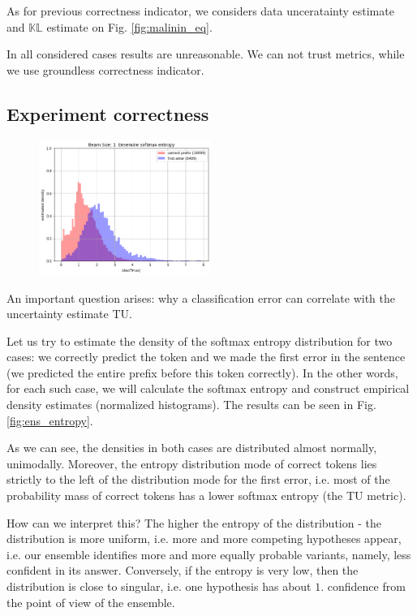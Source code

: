 \documentclass[a4paper,14pt]{extarticle}
\begin{document}
	As for previous correctness indicator, we considers data unceratainty estimate and $\mathbb{KL}$ estimate on Fig. \ref{fig:malinin_eq}.
	
	In all considered cases results are unreasonable. We can not trust metrics, while we use groundless correctness indicator.
	
\subsection{Experiment correctness}
	\begin{figure}
		\includegraphics[width=0.5\textwidth]{images/ens_entropy.png}
	\end{figure}
	
	An important question arises: why a classification error can correlate with the uncertainty estimate TU.
	
	Let us try to estimate the density of the softmax entropy distribution for two cases: we correctly predict the token and we made the first error in the sentence (we predicted the entire prefix before this token correctly). In the other words, for each such case, we will calculate the softmax entropy and construct empirical density estimates (normalized histograms). The results can be seen in Fig. \ref{fig:ens_entropy}.

	As we can see, the densities in both cases are distributed almost normally, unimodally. Moreover, the entropy distribution mode of correct tokens lies strictly to the left of the distribution mode for the first error, i.e. most of the probability mass of correct tokens has a lower softmax entropy (the TU metric).

	How can we interpret this? The higher the entropy of the distribution - the distribution is more uniform, i.e. more and more competing hypotheses appear, i.e. our ensemble identifies more and more equally probable variants, namely, less confident in its answer. Conversely, if the entropy is very low, then the distribution is close to singular, i.e. one hypothesis has about $1.$ confidence from the point of view of the ensemble.
\end{document}
